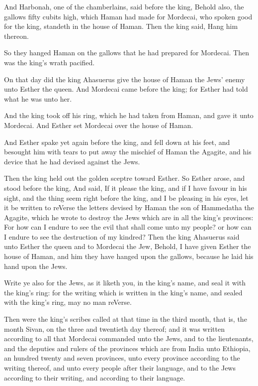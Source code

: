 \Verse And Harbonah, one of the chamberlains, said before the king, Behold also, the gallows fifty cubits high, which Haman had made for Mordecai, who spoken good for the king, standeth in the house of Haman. Then the king said, Hang him thereon.

\Verse So they hanged Haman on the gallows that he had prepared for Mordecai. Then was the king's wrath pacified.


\Chapter
\Verse On that day did the king Ahasuerus give the house of Haman the Jews' enemy unto Esther the queen. And Mordecai came before the king; for Esther had told what he was unto her.

\Verse And the king took off his ring, which he had taken from Haman, and gave it unto Mordecai. And Esther set Mordecai over the house of Haman.

\Verse And Esther spake yet again before the king, and fell down at his feet, and besought him with tears to put away the mischief of Haman the Agagite, and his device that he had devised against the Jews.

\Verse Then the king held out the golden sceptre toward Esther. So Esther arose, and stood before the king, \Verse And said, If it please the king, and if I have favour in his sight, and the thing seem right before the king, and I be pleasing in his eyes, let it be written to reVerse the letters devised by Haman the son of Hammedatha the Agagite, which he wrote to destroy the Jews which are in all the king's provinces: \Verse For how can I endure to see the evil that shall come unto my people?  or how can I endure to see the destruction of my kindred?  \Verse Then the king Ahasuerus said unto Esther the queen and to Mordecai the Jew, Behold, I have given Esther the house of Haman, and him they have hanged upon the gallows, because he laid his hand upon the Jews.

\Verse Write ye also for the Jews, as it liketh you, in the king's name, and seal it with the king's ring: for the writing which is written in the king's name, and sealed with the king's ring, may no man reVerse.

\Verse Then were the king's scribes called at that time in the third month, that is, the month Sivan, on the three and twentieth day thereof; and it was written according to all that Mordecai commanded unto the Jews, and to the lieutenants, and the deputies and rulers of the provinces which are from India unto Ethiopia, an hundred twenty and seven provinces, unto every province according to the writing thereof, and unto every people after their language, and to the Jews according to their writing, and according to their language.

